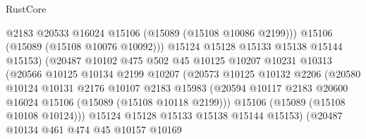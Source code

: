 \begin{lexlean}{RustCore}
\begin{coremodule}
                                    @2183
                                    @20533
                                    @16024
                                    @15106
                                    (@15089 (@15108 @10086 @2199)))
                                  @15106
                                  (@15089 (@15108 @10076 @10092)))
                                @15124
                                @15128
                                @15133
                                @15138
                                @15144
                                @15153)
                              (@20487
                                @10102
                                @475
                                @502
                                @45
                                @10125
                                @10207
                                @10231
                                @10313
                                (@20566
                                  @10125
                                  @10134
                                  @2199
                                  @10207
                                  (@20573
                                    @10125
                                    @10132
                                    @2206
                                    (@20580
                                      @10124
                                      @10131
                                      @2176
                                      @10107
                                      @2183
                                      @15983
                                      (@20594
                                        @10117
                                        @2183
                                        @20600
                                        @16024
                                        @15106
                                        (@15089 (@15108 @10118 @2199)))
                                      @15106
                                      (@15089 (@15108 @10108 @10124)))
                                    @15124
                                    @15128
                                    @15133
                                    @15138
                                    @15144
                                    @15153)
                                  (@20487
                                    @10134
                                    @461
                                    @474
                                    @45
                                    @10157
                                    @10169

\end{coremodule}
\end{lexlean}
